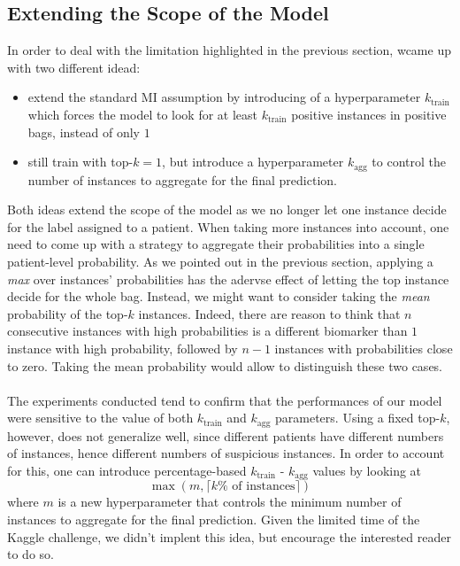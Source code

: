 \documentclass[final]{cvpr}
\begin{document}
	\subsection{Extending  the Scope of the Model} 
	\label{extendedMIL}
	
	In order to deal with the limitation highlighted in the previous section, wcame up with two different idead:
	
	\begin{itemize}
		\item extend the standard MI assumption by introducing of a hyperparameter $k_{\text{train}}$ which forces the model to look for at least $k_{\text{train}}$ positive instances in positive bags, instead of only $1$
		\item still train with top-$k = 1$, but introduce a hyperparameter $k_{\text{agg}}$ to control the number of instances to aggregate for the final prediction.
	\end{itemize}
	
	\noindent
	Both ideas extend the scope of the model as we no longer let one instance decide for the label assigned to a patient. When taking more instances into account, one need to come up with a strategy to aggregate their probabilities into a single patient-level probability. As we pointed out in the previous section, applying a \textit{max} over instances’ probabilities has the adervse effect of letting the top instance decide for the whole bag. Instead, we might want to consider taking the \textit{mean} probability of the top-$k$ instances. Indeed, there are reason to think that $n$ consecutive instances with high probabilities is a different biomarker than $1$ instance with high probability, followed by $n-1$ instances with probabilities close to zero. Taking the mean probability would allow to distinguish these two cases.\\
	\\
	The experiments conducted tend to confirm that the performances of our model were sensitive to the value of both $k_{\text{train}}$ and $k_{\text{agg}}$ parameters. Using a fixed top-$k$, however, does not generalize well, since different patients have different numbers of instances, hence different numbers of suspicious instances. In order to account for this, one can introduce percentage-based $k_{\text{train}}$ - $k_{\text{agg}}$ values by looking at $$ \max \left(m, \lceil k\% \text{ of instances}\rceil\right) $$ where $m$ is a new hyperparameter that controls the minimum number of instances to aggregate for the final prediction. Given the limited time of the Kaggle challenge, we didn't implent this idea, but encourage the interested reader to do so.
	
\end{document}
